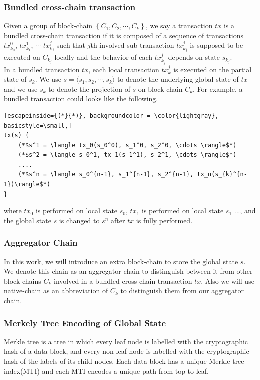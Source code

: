 \documentclass[acmtog, natbib=false]{acmart}
\begin{document}
\subsubsection{Bundled cross-chain transaction}
Given a group of block-chain $\left\{C_{1}, C_{2}, \cdots, C_{k}\right\}$, we say a transaction $tx$ is a bundled cross-chain transaction if it is composed of a sequence of transactions $tx_{k_0}^0$, $tx_{k_1}^1$, $\cdots$ $tx_{k_j}^j$ such that $j$th involved sub-transaction $tx_{k_j}^j$ is supposed to be executed on $C_{k_j}$ locally and the behavior of each $tx_{k_j}^{j}$ depends on state $s_{k_j}$. \\
\newline
In a bundled transaction $tx$, each local transaction $tx_k^j$ is executed on the partial state of $s_k$. We use $s= \langle s_1, s_2, \cdots, s_k \rangle$ to denote the underlying global state of $tx$ and we use $s_k$ to denote the projection of $s$ on block-chain $C_k$. For example, a bundled transaction could looks like the following. 
\begin{lstlisting}[escapeinside={(*}{*)}, backgroundcolor = \color{lightgray}, basicstyle=\small,]
tx(s) {
    (*$s^1 = \langle tx_0(s_0^0), s_1^0, s_2^0, \cdots \rangle$*)
    (*$s^2 = \langle s_0^1, tx_1(s_1^1), s_2^1, \cdots \rangle$*)
    ....
    (*$s^n = \langle s_0^{n-1}, s_1^{n-1}, s_2^{n-1}, tx_n(s_{k}^{n-1})\rangle$*)
}
\end{lstlisting}
where $tx_0$ is performed on local state $s_0$, $tx_1$ is performed on local state $s_1$ ..., and the global state $s$ is changed to $s^n$ after $tx$ is fully performed.

\subsubsection{Aggregator Chain}
In this work, we will introduce an extra block-chain to store the global state $s$. We denote this chain as an aggregator chain to distinguish between it from other block-chains $C_{k}$ involved in a bundled cross-chain transaction $tx$. Also we will use native-chain as an abbreviation of $C_{k}$ to distinguish them from our aggregator chain.

\subsubsection{Merkely Tree Encoding of Global State}
Merkle\cite{becker2008merkle} tree is a tree in which every leaf node is labelled with the cryptographic hash of a data block, and every non-leaf node is labelled with the cryptographic hash of the labels of its child nodes. Each data block has a unique Merkle tree index(MTI) and each MTI encodes a unique path from top to leaf.
\end{document}
